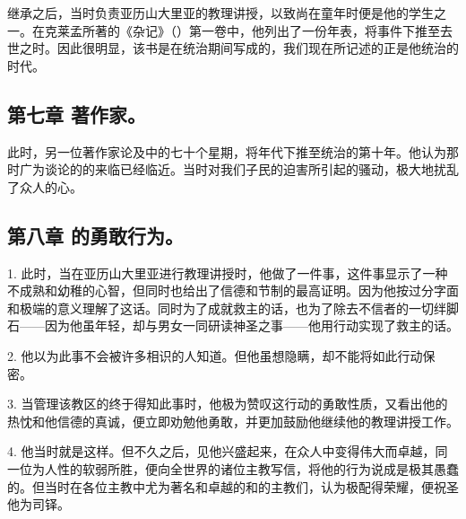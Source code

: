 继承之后，当时负责亚历山大里亚的教理讲授，以致尚在童年时便是他的学生之一。在克莱孟所著的《杂记》（）第一卷中，他列出了一份年表，将事件下推至去世之时。因此很明显，该书是在统治期间写成的，我们现在所记述的正是他统治的时代。\par


\subsection{第七章 著作家。}

此时，另一位著作家论及中的七十个星期，将年代下推至统治的第十年。他认为那时广为谈论的的来临已经临近。当时对我们子民的迫害所引起的骚动，极大地扰乱了众人的心。\par


\subsection{第八章 的勇敢行为。}

1. 此时，当在亚历山大里亚进行教理讲授时，他做了一件事，这件事显示了一种不成熟和幼稚的心智，但同时也给出了信德和节制的最高证明。因为他按过分字面和极端的意义理解了这话。同时为了成就救主的话，也为了除去不信者的一切绊脚石——因为他虽年轻，却与男女一同研读神圣之事——他用行动实现了救主的话。\par

2. 他以为此事不会被许多相识的人知道。但他虽想隐瞒，却不能将如此行动保密。\par

3. 当管理该教区的终于得知此事时，他极为赞叹这行动的勇敢性质，又看出他的热忱和他信德的真诚，便立即劝勉他勇敢，并更加鼓励他继续他的教理讲授工作。\par

4. 他当时就是这样。但不久之后，见他兴盛起来，在众人中变得伟大而卓越，同一位为人性的软弱所胜，便向全世界的诸位主教写信，将他的行为说成是极其愚蠢的。但当时在各位主教中尤为著名和卓越的和的主教们，认为极配得荣耀，便祝圣他为司铎。\par

